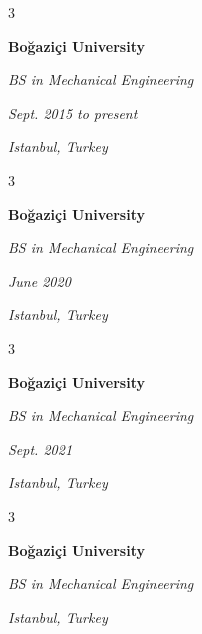 \documentclass[10pt, letterpaper]{article}
\newenvironment{threecolentry}[3][]{
    \onecolentry
    \def\thirdColumn{#3}
    \setcolumnwidth{0.6 cm, \fill, 4.5 cm}
    \begin{paracol}{3}
    #2 \switchcolumn
}{
    \switchcolumn \raggedleft \thirdColumn
    \end{paracol}
    \endonecolentry
} %
\begin{document}
        \vspace{0.2 cm}

        \begin{threecolentry}{
            \vspace*{\fill}
            \textbullet
            \vspace*{3px}
            \vspace*{\fill}
        }{
        \textit{Sept. 2015 to present}
            
        \textit{Istanbul, Turkey}}
            \textbf{Boğaziçi University}

            \textit{BS in Mechanical Engineering}
        \end{threecolentry}



        \vspace{0.2 cm}

        \begin{threecolentry}{
            \vspace*{\fill}
            \textbullet
            \vspace*{3px}
            \vspace*{\fill}
        }{
        \textit{June 2020}
            
        \textit{Istanbul, Turkey}}
            \textbf{Boğaziçi University}

            \textit{BS in Mechanical Engineering}
        \end{threecolentry}



        \vspace{0.2 cm}

        \begin{threecolentry}{
            \vspace*{\fill}
            \textbullet
            \vspace*{3px}
            \vspace*{\fill}
        }{
        \textit{Sept. 2021}
            
        \textit{Istanbul, Turkey}}
            \textbf{Boğaziçi University}

            \textit{BS in Mechanical Engineering}
        \end{threecolentry}



        \vspace{0.2 cm}

        \begin{threecolentry}{
            \vspace*{\fill}
            \textbullet
            \vspace*{3px}
            \vspace*{\fill}
        }{

            
        \textit{Istanbul, Turkey}}
            \textbf{Boğaziçi University}

            \textit{BS in Mechanical Engineering}
        \end{threecolentry}
\end{document}
